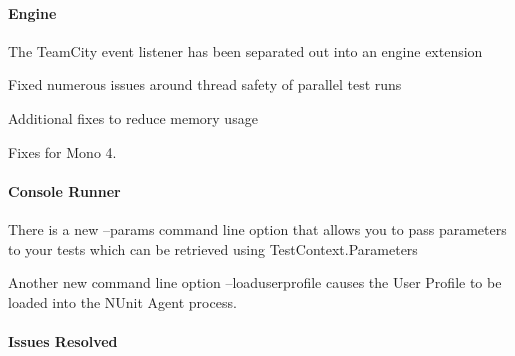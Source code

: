 \paragraph*{Engine}


\begin{DoxyItemize}
\item The Team\+City event listener has been separated out into an engine extension
\item Fixed numerous issues around thread safety of parallel test runs
\item Additional fixes to reduce memory usage
\item Fixes for Mono 4.
\end{DoxyItemize}

\paragraph*{Console Runner}


\begin{DoxyItemize}
\item There is a new --params command line option that allows you to pass parameters to your tests which can be retrieved using Test\+Context.\+Parameters
\item Another new command line option --loaduserprofile causes the User Profile to be loaded into the N\+Unit Agent process.
\end{DoxyItemize}

\paragraph*{Issues Resolved}



